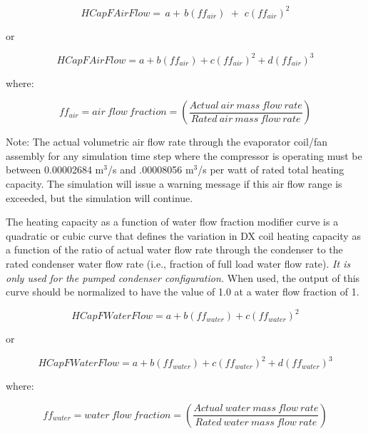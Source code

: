 \begin{equation}
HCapFAirFlow = \,a + \,b\left( {f{f_{air}}} \right)\,\, + \,\,c{\left( {f{f_{air}}} \right)^2}
\end{equation}

or

\begin{equation}
HCapFAirFlow = a + b\left( {f{f_{air}}} \right) + c{\left( {f{f_{air}}} \right)^2} + d{\left( {f{f_{air}}} \right)^3}
\end{equation}

where:

\begin{equation}
f{f_{air}} = air~flow~fraction = \left( {\frac{{Actual~air~mass~flow~rate}}{{Rated~air~mass~flow~rate}}} \right)
\end{equation}

Note: The actual volumetric air flow rate through the evaporator coil/fan assembly for any simulation time step where the compressor is operating must be between 0.00002684 m\(^{3}\)/s and .00008056 m\(^{3}\)/s per watt of rated total heating capacity. The simulation will issue a warning message if this air flow range is exceeded, but the simulation will continue.

The heating capacity as a function of water flow fraction modifier curve is a quadratic or cubic curve that defines the variation in DX coil heating capacity as a function of the ratio of actual water flow rate through the condenser to the rated condenser water flow rate (i.e., fraction of full load water flow rate). \emph{It is only used for the pumped condenser configuration.} When used, the output of this curve should be normalized to have the value of 1.0 at a water flow fraction of 1.

\begin{equation}
HCapFWaterFlow = a + b\left( {f{f_{water}}} \right) + c{\left( {f{f_{water}}} \right)^2}
\end{equation}

or

\begin{equation}
HCapFWaterFlow = a + b\left( {f{f_{water}}} \right) + c{\left( {f{f_{water}}} \right)^2} + d{\left( {f{f_{water}}} \right)^3}
\end{equation}

where:

\begin{equation}
f{f_{water}} = water~flow~fraction = \left( {\frac{{Actual~water~mass~flow~rate}}{{Rated~water~mass~flow~rate}}} \right)
\end{equation}

